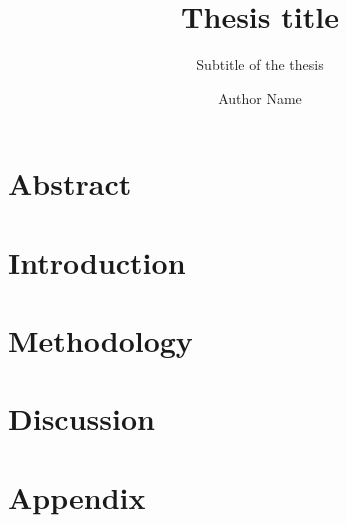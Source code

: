 \documentclass[
  a4paper,            %
  thesis=phd,         %
  english,            %
]{tumbook}
\title{Thesis title}
\subtitle{Subtitle of the thesis}
\author{Author Name}
\begin{document}
\frontmatter
\maketitle
\chapter{Abstract}

\tableofcontents

\mainmatter
\chapter{Introduction}


\chapter{Methodology}


\chapter{Discussion}


\appendix
\chapter{Appendix}
\lipsum[4]

% 
\end{document}

